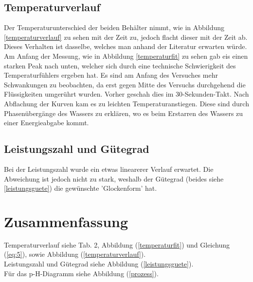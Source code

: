 \documentclass{article}
\begin{document}
\subsection{Temperaturverlauf}
Der Temperaturunterschied der beiden Behälter nimmt, wie in Abbildung \ref{temperaturverlauf} zu sehen mit der Zeit zu, jedoch flacht dieser mit der Zeit ab. Dieses Verhalten ist dasselbe, welches man anhand der Literatur \cite{pumpenscript} erwarten würde. Am Anfang der Messung, wie in Abbildung \ref{temperaturfit} zu sehen gab eis einen starken Peak nach unten, welcher sich durch eine technische Schwierigkeit des Temperaturfühlers ergeben hat. Es sind am Anfang des Versuches mehr Schwankungen zu beobachten, da erst gegen Mitte des Versuchs durchgehend die Flüssigkeiten umgerührt wurden. Vorher geschah dies im 30-Sekunden-Takt. Nach Abflachung der Kurven kam es zu leichten Temperaturanstiegen. Diese sind durch Phasenübergänge des Wassers zu erklären, wo es beim Erstarren des Wassers zu einer Energieabgabe kommt.
\\
\subsection{Leistungszahl und Gütegrad}
Bei der Leistungszahl wurde ein etwas linearerer Verlauf erwartet. Die Abweichung ist jedoch nicht zu stark, weshalb der Gütegrad (beides siehe \ref{leistungsguete}) die gewünschte 'Glockenform' hat.





\newpage
\section{Zusammenfassung}
Temperaturverlauf siehe Tab. 2, Abbildung (\ref{temperaturfit}) und Gleichung (\ref{eq:5}),
sowie Abbildung (\ref{temperaturverlauf}). \\

Leistungszahl und Gütegrad siehe Abbildung (\ref{leistungsguete}).\\

Für das p-H-Diagramm siehe Abbildung (\ref{prozess}).
\newpage
\printbibliography[title = Literatur]
\end{document}
